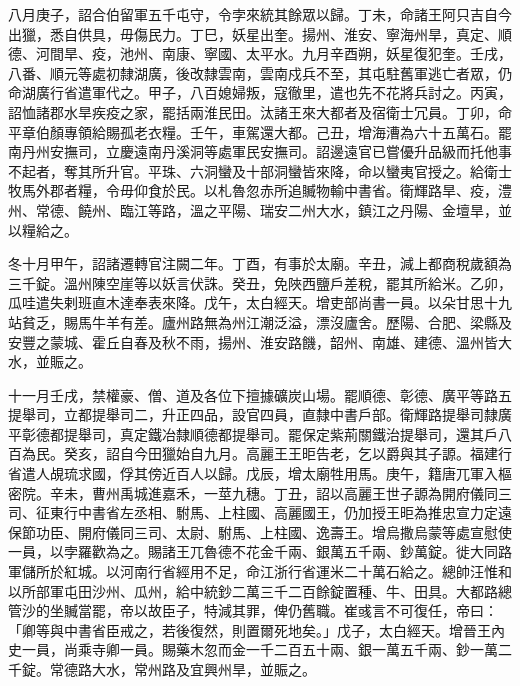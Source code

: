\begin{pinyinscope}
 八月庚子，詔合伯留軍五千屯守，令孛來統其餘眾以歸。丁未，命諸王阿只吉自今出獵，悉自供具，毋傷民力。丁巳，妖星出奎。揚州、淮安、寧海州旱，真定、順德、河間旱、疫，池州、南康、寧國、太平水。九月辛酉朔，妖星復犯奎。壬戌，八番、順元等處初隸湖廣，後改隸雲南，雲南戍兵不至，其屯駐舊軍逃亡者眾，仍命湖廣行省遣軍代之。甲子，八百媳婦叛，寇徹里，遣也先不花將兵討之。丙寅，詔恤諸郡水旱疾疫之家，罷括兩淮民田。汰諸王來大都者及宿衛士冗員。丁卯，命平章伯顏專領給賜孤老衣糧。壬午，車駕還大都。己丑，增海漕為六十五萬石。罷南丹州安撫司，立慶遠南丹溪洞等處軍民安撫司。詔邊遠官已嘗優升品級而托他事不起者，奪其所升官。平珠、六洞蠻及十部洞蠻皆來降，命以蠻夷官授之。給衛士牧馬外郡者糧，令毋仰食於民。以札魯忽赤所追贓物輸中書省。衛輝路旱、疫，澧州、常德、饒州、臨江等路，溫之平陽、瑞安二州大水，鎮江之丹陽、金壇旱，並以糧給之。



 冬十月甲午，詔諸遷轉官注闕二年。丁酉，有事於太廟。辛丑，減上都商稅歲額為三千錠。溫州陳空崖等以妖言伏誅。癸丑，免陜西鹽戶差稅，罷其所給米。乙卯，瓜哇遣失剌班直木達奉表來降。戊午，太白經天。增吏部尚書一員。以朵甘思十九站貧乏，賜馬牛羊有差。廬州路無為州江潮泛溢，漂沒廬舍。歷陽、合肥、梁縣及安豐之蒙城、霍丘自春及秋不雨，揚州、淮安路饑，韶州、南雄、建德、溫州皆大水，並賑之。



 十一月壬戌，禁權豪、僧、道及各位下擅據礦炭山場。罷順德、彰德、廣平等路五提舉司，立都提舉司二，升正四品，設官四員，直隸中書戶部。衛輝路提舉司隸廣平彰德都提舉司，真定鐵冶隸順德都提舉司。罷保定紫荊關鐵治提舉司，還其戶八百為民。癸亥，詔自今田獵始自九月。高麗王王昛告老，乞以爵與其子謜。福建行省遣人覘琉求國，俘其傍近百人以歸。戊辰，增太廟牲用馬。庚午，籍唐兀軍入樞密院。辛未，曹州禹城進嘉禾，一莖九穗。丁丑，詔以高麗王世子謜為開府儀同三司、征東行中書省左丞相、駙馬、上柱國、高麗國王，仍加授王昛為推忠宣力定遠保節功臣、開府儀同三司、太尉、駙馬、上柱國、逸壽王。增烏撒烏蒙等處宣慰使一員，以孛羅歡為之。賜諸王兀魯德不花金千兩、銀萬五千兩、鈔萬錠。徙大同路軍儲所於紅城。以河南行省經用不足，命江浙行省運米二十萬石給之。總帥汪惟和以所部軍屯田沙州、瓜州，給中統鈔二萬三千二百餘錠置種、牛、田具。大都路總管沙的坐贓當罷，帝以故臣子，特減其罪，俾仍舊職。崔彧言不可復任，帝曰：「卿等與中書省臣戒之，若後復然，則置爾死地矣。」戊子，太白經天。增晉王內史一員，尚乘寺卿一員。賜藥木忽而金一千二百五十兩、銀一萬五千兩、鈔一萬二千錠。常德路大水，常州路及宜興州旱，並賑之。




\end{pinyinscope}
